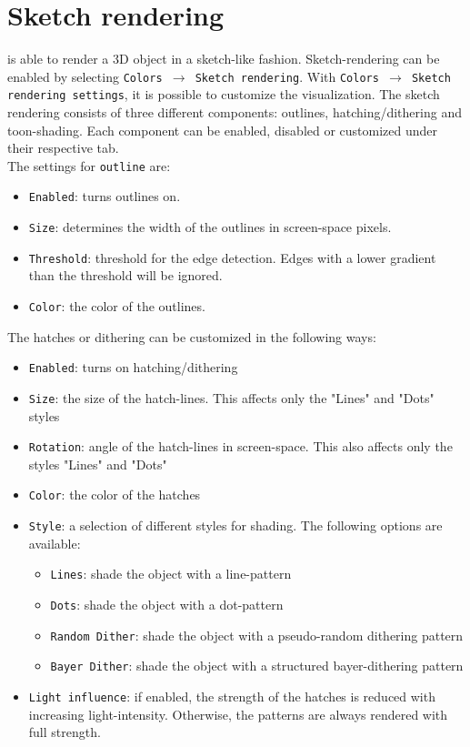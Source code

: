 \section{Sketch rendering}
\GigaMesh is able to render a 3D object in a sketch-like fashion. Sketch-rendering can be enabled by selecting \texttt{Colors $\rightarrow$ Sketch rendering}. With \texttt{Colors $\rightarrow$ Sketch rendering settings}, it is possible to customize the visualization. The sketch rendering consists of three different components: outlines, hatching/dithering and toon-shading. Each component can be enabled, disabled or customized under their respective tab.\\
The settings for \texttt{outline} are:
\begin{itemize}
\item \texttt{Enabled}: turns outlines on.
\item \texttt{Size}: determines the width of the outlines in screen-space pixels.
\item \texttt{Threshold}: threshold for the edge detection. Edges with a lower gradient than the threshold will be ignored.
\item \texttt{Color}: the color of the outlines.
\end{itemize}
The hatches or dithering can be customized in the following ways:
\begin{itemize}
\item \texttt{Enabled}: turns on hatching/dithering
\item \texttt{Size}: the size of the hatch-lines. This affects only the "Lines" and "Dots" styles
\item \texttt{Rotation}: angle of the hatch-lines in screen-space. This also affects only the styles "Lines" and "Dots"
\item \texttt{Color}: the color of the hatches
\item \texttt{Style}: a selection of different styles for shading. The following options are available:
\begin{itemize}
\item \texttt{Lines}: shade the object with a line-pattern
\item \texttt{Dots}: shade the object with a dot-pattern
\item \texttt{Random Dither}: shade the object with a pseudo-random dithering pattern
\item \texttt{Bayer Dither}: shade the object with a structured bayer-dithering pattern
\end{itemize}
\item \texttt{Light influence}: if enabled, the strength of the hatches is reduced with increasing light-intensity. Otherwise, the patterns are always rendered with full strength.
\end{itemize}
